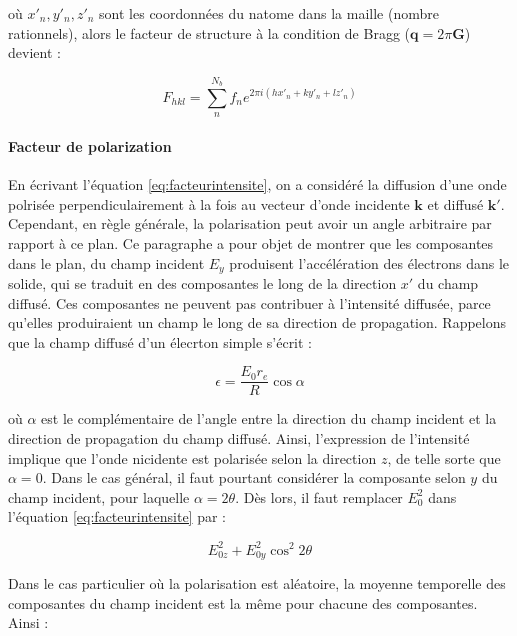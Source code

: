 où $x'_n, y'_n, z'_n$ sont les coordonnées du n\ieme atome dans la maille (nombre rationnels), alors le facteur de structure à la condition de Bragg ($\mathbf{q} = 2\pi \mathbf{G}$) devient :

\begin{equation}
    F_{hkl} = \sum_n^{N_b} f_n e^{2\pi i (h x'_n + k y'_n + l z'_n)}
\end{equation}

\paragraph{Facteur de polarization}

En écrivant l'équation \ref{eq:facteurintensite}, on a considéré la diffusion d'une onde polrisée perpendiculairement à la fois au vecteur d'onde incidente $\mathbf{k}$ et diffusé $\mathbf{k}'$. Cependant, en règle générale, la polarisation peut avoir un angle arbitraire par rapport à ce plan. Ce paragraphe a pour objet de montrer que les composantes dans le plan, du champ incident $E_y$ produisent l'accélération des électrons dans le solide, qui se traduit en des composantes le long de la direction $x'$ du champ diffusé. Ces composantes ne peuvent pas contribuer à l'intensité diffusée, parce qu'elles produiraient un champ le long de sa direction de propagation.
Rappelons que la champ diffusé d'un élecrton simple s'écrit :

\begin{equation}
    \epsilon = \frac{E_0 r_e}{R} \cos \alpha
\end{equation}

où $\alpha$ est le complémentaire de l'angle entre la direction du champ incident et la direction de propagation du champ diffusé. Ainsi, l'expression de l'intensité implique que l'onde nicidente est polarisée selon la direction $z$, de telle sorte que $\alpha = 0$. Dans le cas général, il faut pourtant considérer la composante selon $y$ du champ incident, pour laquelle $\alpha = 2 \theta$. Dès lors, il faut remplacer $E_0^2$ dans l'équation \ref{eq:facteurintensite} par :

\begin{equation}
    E_{0z}^2 + E_{0y}^2 \cos^2 2\theta
    \label{eq:champincid}
\end{equation}

Dans le cas particulier où la polarisation est aléatoire, la moyenne temporelle des composantes du champ incident est la même pour chacune des composantes. Ainsi :

